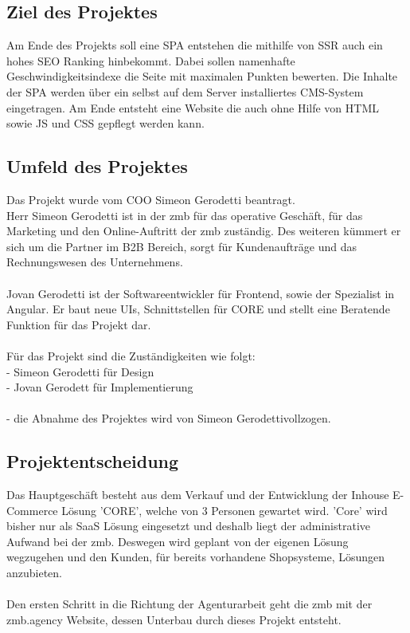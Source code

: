 \documentclass[11pt,a4paper]{article}
\begin{document}
\subsection{Ziel des Projektes}
Am Ende des Projekts soll eine \acs{SPA} entstehen die mithilfe von \acs{SSR} auch ein hohes SEO Ranking hinbekommt. Dabei sollen namenhafte Geschwindigkeitsindexe die Seite mit maximalen Punkten bewerten.
Die Inhalte der \acs{SPA} werden über ein selbst auf dem Server installiertes CMS-System eingetragen.
Am Ende entsteht eine Website die auch ohne Hilfe von HTML sowie JS und CSS gepflegt werden kann.
\subsection{Umfeld des Projektes}
Das Projekt wurde vom COO Simeon Gerodetti beantragt.\\
Herr Simeon Gerodetti ist in der zmb für das operative Geschäft, für das Marketing und den Online-Auftritt der zmb zuständig.
Des weiteren kümmert er sich um die Partner im \acs{B2B} Bereich, sorgt für Kundenaufträge und das Rechnungswesen des Unternehmens.\\\\
Jovan Gerodetti ist der Softwareentwickler für Frontend, sowie der Spezialist in Angular. Er baut neue UIs, Schnittstellen für CORE und stellt eine Beratende Funktion für das Projekt dar.\\\\
Für das Projekt sind die Zuständigkeiten wie folgt:\\
- Simeon Gerodetti für Design\\
- Jovan Gerodett für Implementierung\\\\
- die Abnahme des Projektes wird von Simeon Gerodettivollzogen.
\subsection{Projektentscheidung}
Das Hauptgeschäft besteht aus dem Verkauf und der Entwicklung der Inhouse E-Commerce Lösung 'CORE', welche von 3 Personen gewartet wird. 'Core' wird bisher nur als SaaS Lösung eingesetzt und deshalb liegt der administrative Aufwand bei der zmb. Deswegen wird geplant von der eigenen Lösung wegzugehen und den Kunden, für bereits vorhandene Shopsysteme, Lösungen anzubieten.\\\\
Den ersten Schritt in die Richtung der Agenturarbeit geht die zmb mit der zmb.agency Website, dessen Unterbau durch dieses Projekt entsteht.
\end{document}
